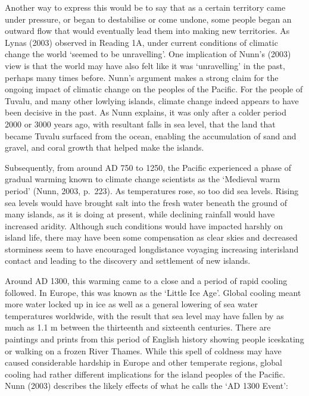 \documentclass[letterpaper,10pt,english]{sphinxmanual}
\begin{document}
Another way to express this would be to say that as a certain territory came under pressure, or began to destabilise or come undone, some people began an outward flow that would eventually lead them into making new territories. As Lynas (2003) observed in Reading 1A, under current conditions of climatic change the world ‘seemed to be unravelling’. One implication of Nunn’s (2003) view is that the world may have also felt like it was ‘unravelling’ in the past, perhaps many times before. Nunn’s
argument makes a strong claim for the ongoing impact of climatic change on the peoples of the Pacific. For the people of Tuvalu, and many other low\sphinxhyphen{}lying islands, climate change indeed appears to have been decisive in the past. As Nunn explains, it was only after a colder period 2000 or 3000 years ago, with resultant falls in sea level, that the land that became Tuvalu surfaced from the ocean, enabling the accumulation of sand and gravel, and coral growth that helped make the islands.

Subsequently, from around AD 750 to 1250, the Pacific experienced a phase of gradual warming known to climate change scientists as the ‘Medieval warm period’ (Nunn, 2003, p. 223). As temperatures rose, so too did sea levels. Rising sea levels would have brought salt into the fresh water beneath the ground of many islands, as it is doing at present, while declining rainfall would have increased aridity. Although such conditions would have impacted harshly on island life, there may have been some
compensation as clear skies and decreased storminess seem to have encouraged long\sphinxhyphen{}distance voyaging \textendash{} increasing inter\sphinxhyphen{}island contact and leading to the discovery and settlement of new islands.

Around AD 1300, this warming came to a close and a period of rapid cooling followed. In Europe, this was known as the ‘Little Ice Age’. Global cooling meant more water locked up in ice as well as a general lowering of sea water temperatures worldwide, with the result that sea level may have fallen by as much as 1.1 m between the thirteenth and sixteenth centuries. There are paintings and prints from this period of English history showing people ice\sphinxhyphen{}skating or walking on a frozen River Thames.
While this spell of coldness may have caused considerable hardship in Europe and other temperate regions, global cooling had rather different implications for the island peoples of the Pacific. Nunn (2003) describes the likely effects of what he calls the ‘AD 1300 Event’:
\end{document}
